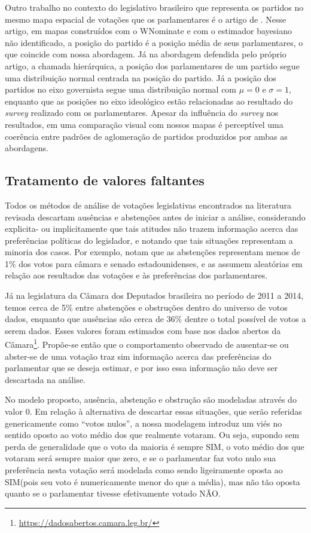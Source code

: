 \documentclass[
	article,			%
	12pt,				%
    twoside,			%
	a4paper,			%
	english,			%
	french,				%
	spanish,			%
	brazil,				%
	]{abntex2}
\newcommand\nay{NÃO\xspace}
\newcommand\yea{SIM\xspace}
\begin{document}
Outro trabalho no contexto do legislativo brasileiro que representa os partidos no mesmo mapa espacial de votações que os parlamentares é o artigo de . Nesse artigo, em mapas construídos com o WNominate e com o estimador bayesiano não identificado, a posição do partido é a posição média de seus parlamentares, o que coincide com nossa abordagem. Já na abordagem defendida pelo próprio artigo, a chamada hierárquica, a posição dos parlamentares de um partido segue uma distribuição normal centrada na posição do partido. Já a posição dos partidos no eixo governista segue uma distribuição normal com $\mu = 0$ e $\sigma = 1$, enquanto que as posições no eixo ideológico estão relacionadas ao resultado do \emph{survey} realizado com os parlamentares. 
Apesar da influência do \emph{survey} nos resultados, em uma comparação visual com nossos mapas é perceptível uma coerência entre padrões de aglomeração de partidos produzidos por ambas as abordagens.

\subsection{Tratamento de valores faltantes}
\label{sec:valores_faltantes}

Todos os métodos de análise de votações legislativas encontrados na literatura revisada descartam ausências e abstenções antes de iniciar a análise, considerando explicita- ou implicitamente que tais atitudes não trazem informação acerca das preferências políticas do legislador, e notando que tais situações representam a minoria dos casos. Por exemplo,  notam que as abstenções representam menos de 1\% dos votos para câmara e senado estadounidenses, e as assumem aleatórias em relação aos resultados das votações e às preferências dos parlamentares.

Já na legislatura da Câmara dos Deputados brasileira no período de 2011 a 2014, temos cerca de 5\% entre abstenções e obstruções dentro do universo de votos dados, enquanto que ausências são cerca de 36\% dentre o total possível de votos a serem dados. Esses valores foram estimados com base nos dados abertos da Câmara\footnote{\url{https://dadosabertos.camara.leg.br/}}. Propõe-se então que o comportamento observado de ausentar-se ou abster-se de uma votação traz sim informação acerca das preferências do parlamentar que se deseja estimar, e por isso essa informação não deve ser descartada na análise.

No modelo proposto, ausência, abstenção e obstrução são modeladas através do valor 0. Em relação à alternativa de descartar essas situações, que serão referidas genericamente como ``votos nulos'', a nossa modelagem introduz um viés no sentido oposto ao voto médio dos que realmente votaram. Ou seja, supondo sem perda de generalidade que o voto da maioria é sempre \yea, o voto médio dos que votaram será sempre maior que zero, e se o parlamentar faz voto nulo sua preferência nesta votação será modelada como sendo ligeiramente oposta ao \yea (pois seu voto é numericamente menor do que a média), mas não tão oposta quanto se o parlamentar tivesse efetivamente votado \nay.
\end{document}
